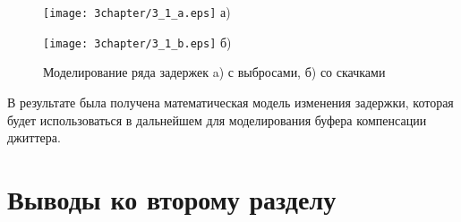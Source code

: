 \begin{figure} [h]
\begin{minipage}[h]{0.47\linewidth}
\center
\texttt{[image: 3chapter/3\_1\_a.eps]} а) \\
\end{minipage}
\hfill
\begin{minipage}[h]{0.47\linewidth}
\center
\texttt{[image: 3chapter/3\_1\_b.eps]} б) \\
\end{minipage}
\caption{Моделирование ряда задержек a) с выбросами, б) со скачками}
\label{img3:modelJitter}
\end{figure}

В результате была получена математическая модель изменения задержки, которая будет использоваться в дальнейшем для моделирования буфера компенсации джиттера.





\section{Выводы ко второму разделу} \label{sect:concl2}

